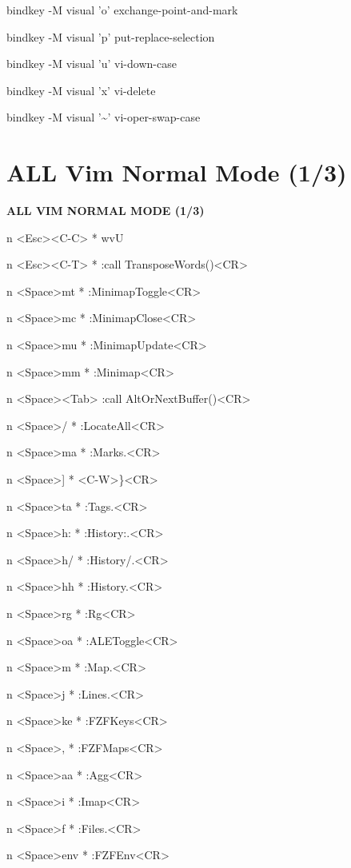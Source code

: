\documentclass[11pt,a4paper,twoside]{book}
\begin{document}
bindkey -M visual 'o' exchange-point-and-mark

bindkey -M visual 'p' put-replace-selection

bindkey -M visual 'u' vi-down-case

bindkey -M visual 'x' vi-delete

bindkey -M visual '\textasciitilde{}' vi-oper-swap-case


\vspace{16pt}

\section{ALL Vim Normal Mode (1/3)}


\vspace{10pt}
{\large\bfseries\color{neoncyan} ALL VIM NORMAL MODE (1/3)}\vspace{6pt}

n  <Esc><C-C>  * wvU

n  <Esc><C-T>  * :call TransposeWords()<CR>

n  <Space>mt  * :MinimapToggle<CR>

n  <Space>mc  * :MinimapClose<CR>

n  <Space>mu  * :MinimapUpdate<CR>

n  <Space>mm  * :Minimap<CR>

n  <Space><Tab>  :call AltOrNextBuffer()<CR>

n  <Space>/  * :LocateAll<CR>

n  <Space>ma  * :Marks.<CR>

n  <Space>]  * <C-W>\}<CR>

n  <Space>ta  * :Tags.<CR>

n  <Space>h:  * :History:.<CR>

n  <Space>h/  * :History/.<CR>

n  <Space>hh  * :History.<CR>

n  <Space>rg  * :Rg<CR>

n  <Space>oa  * :ALEToggle<CR>

n  <Space>m  * :Map.<CR>

n  <Space>j  * :Lines.<CR>

n  <Space>ke  * :FZFKeys<CR>

n  <Space>,  * :FZFMaps<CR>

n  <Space>aa  * :Agg<CR>

n  <Space>i  * :Imap<CR>

n  <Space>f  * :Files.<CR>

n  <Space>env  * :FZFEnv<CR>
\end{document}
